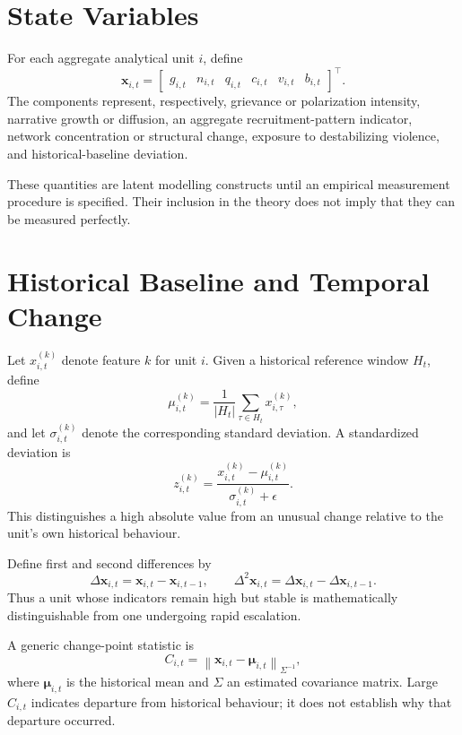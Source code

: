 \documentclass[11pt,letterpaper]{article}
\begin{document}
\section{State Variables}
For each aggregate analytical unit $i$, define
\begin{equation}
\mathbf{x}_{i,t}=
\begin{bmatrix}
 g_{i,t} & n_{i,t} & q_{i,t} & c_{i,t} & v_{i,t} & b_{i,t}
\end{bmatrix}^{\top}.
\end{equation}
The components represent, respectively, grievance or polarization intensity, narrative growth or diffusion, an aggregate recruitment-pattern indicator, network concentration or structural change, exposure to destabilizing violence, and historical-baseline deviation.

These quantities are latent modelling constructs until an empirical measurement procedure is specified. Their inclusion in the theory does not imply that they can be measured perfectly.

\section{Historical Baseline and Temporal Change}
Let $x_{i,t}^{(k)}$ denote feature $k$ for unit $i$. Given a historical reference window $H_t$, define
\begin{equation}
\mu_{i,t}^{(k)}=\frac{1}{|H_t|}\sum_{\tau\in H_t}x_{i,\tau}^{(k)},
\end{equation}
and let $\sigma_{i,t}^{(k)}$ denote the corresponding standard deviation. A standardized deviation is
\begin{equation}
z_{i,t}^{(k)}=\frac{x_{i,t}^{(k)}-\mu_{i,t}^{(k)}}{\sigma_{i,t}^{(k)}+\epsilon}.
\end{equation}
This distinguishes a high absolute value from an unusual change relative to the unit's own historical behaviour.

Define first and second differences by
\begin{equation}
\Delta \mathbf{x}_{i,t}=\mathbf{x}_{i,t}-\mathbf{x}_{i,t-1},
\qquad
\Delta^2\mathbf{x}_{i,t}=\Delta\mathbf{x}_{i,t}-\Delta\mathbf{x}_{i,t-1}.
\end{equation}
Thus a unit whose indicators remain high but stable is mathematically distinguishable from one undergoing rapid escalation.

A generic change-point statistic is
\begin{equation}
C_{i,t}=\left\|\mathbf{x}_{i,t}-\boldsymbol{\mu}_{i,t}\right\|_{\Sigma^{-1}},
\end{equation}
where $\boldsymbol{\mu}_{i,t}$ is the historical mean and $\Sigma$ an estimated covariance matrix. Large $C_{i,t}$ indicates departure from historical behaviour; it does not establish why that departure occurred.
\end{document}
